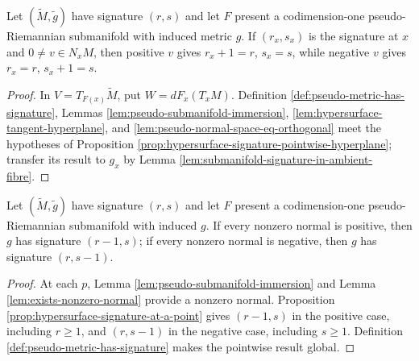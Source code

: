 \begin{proposition}
\label{prop:hypersurface-signature-at-a-point}





Let $(\widetilde M,\widetilde g)$ have signature $(r,s)$ and let $F$ present a codimension-one pseudo-Riemannian submanifold with induced metric $g$. If $(r_x,s_x)$ is the signature at $x$ and $0\ne v\in N_xM$, then positive $v$ gives $r_x+1=r$, $s_x=s$, while negative $v$ gives $r_x=r$, $s_x+1=s$.
\end{proposition}
\begin{proof}

\sketch In $V=T_{F(x)}\widetilde M$, put $W=dF_x(T_xM)$. Definition \ref{def:pseudo-metric-has-signature}, Lemmas \ref{lem:pseudo-submanifold-immersion}, \ref{lem:hypersurface-tangent-hyperplane}, and \ref{lem:pseudo-normal-space-eq-orthogonal} meet the hypotheses of Proposition \ref{prop:hypersurface-signature-pointwise-hyperplane}; transfer its result to $g_x$ by Lemma \ref{lem:submanifold-signature-in-ambient-fibre}.
\end{proof}

\begin{proposition}
\label{prop:pseudo-riemannian-hypersurface-signature}





Let $(\widetilde M,\widetilde g)$ have signature $(r,s)$ and let $F$ present a codimension-one pseudo-Riemannian submanifold with induced $g$. If every nonzero normal is positive, then $g$ has signature $(r-1,s)$; if every nonzero normal is negative, then $g$ has signature $(r,s-1)$.
\end{proposition}
\begin{proof}

\sketch At each $p$, Lemma \ref{lem:pseudo-submanifold-immersion} and Lemma \ref{lem:exists-nonzero-normal} provide a nonzero normal. Proposition \ref{prop:hypersurface-signature-at-a-point} gives $(r-1,s)$ in the positive case, including $r\ge1$, and $(r,s-1)$ in the negative case, including $s\ge1$. Definition \ref{def:pseudo-metric-has-signature} makes the pointwise result global.
\end{proof}

